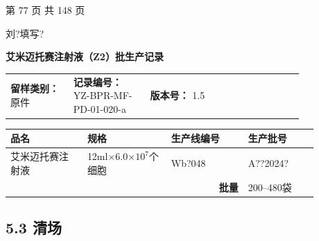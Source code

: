 \documentclass[UTF8,10pt,a4paper,fontset=fandol]{ctexart}
\newcommand{\fieldvalue}[1]{#1}
\newcommand{\handwritten}[1]{#1}
\begin{document}
\vfill

\begin{center}
第 77 页 共 148 页
\end{center}

\handwritten{刘?填写?}

\newpage

\begin{center}
\textbf{艾米迈托赛注射液（Z2）批生产记录}
\end{center}

\begin{tabular}{p{0.18\linewidth}p{0.22\linewidth}p{0.22\linewidth}p{0.22\linewidth}}
\textbf{留样类别：}%
\fieldvalue{原件}
&
\textbf{记录编号：}%
\fieldvalue{YZ-BPR-MF-PD-01-020-a}
&
\textbf{版本号：}%
\fieldvalue{1.5}
\end{tabular}

\vspace{0.5em}

\begin{tabular}{|p{0.22\linewidth}|p{0.24\linewidth}|p{0.22\linewidth}|p{0.20\linewidth}|}
\hline
\textbf{品名} & \textbf{规格} & \textbf{生产线编号} & \textbf{生产批号} \\ \hline
\fieldvalue{艾米迈托赛注射液}
&
\fieldvalue{12ml$\times$6.0$\times10^{7}$个细胞}
&
\fieldvalue{\handwritten{Wb?048}}
&
\fieldvalue{\handwritten{A??2024?}}
\\ \hline
\multicolumn{3}{|r|}{\textbf{批量}} &
\fieldvalue{200--480袋}
\\ \hline
\end{tabular}

\vspace{0.8em}

\subsection*{5.3 清场}
\end{document}

